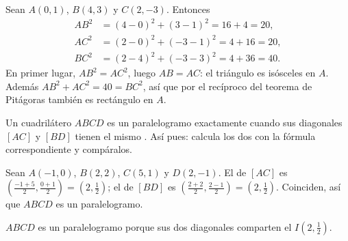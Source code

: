 \begin{example}\label{ex:g10:coordgeom:triangle}
Sean $A(0, 1)$, $B(4, 3)$ y $C(2, -3)$. Entonces
\begin{align*}
AB^2 &= (4-0)^2 + (3-1)^2 = 16 + 4 = 20, \\
AC^2 &= (2-0)^2 + (-3-1)^2 = 4 + 16 = 20, \\
BC^2 &= (2-4)^2 + (-3-3)^2 = 4 + 36 = 40 .
\end{align*}
En primer lugar, $AB^2 = AC^2$, luego $AB = AC$: el triángulo es isósceles
en $A$. Además $AB^2 + AC^2 = 40 = BC^2$, así que por el recíproco del
teorema de Pitágoras también es rectángulo en $A$.
\end{example}

\begin{method}\label{met:g10:coordgeom:parallelogram}
Un cuadrilátero $ABCD$ es un paralelogramo exactamente cuando sus
diagonales $[AC]$ y $[BD]$ tienen el mismo . Así pues: calcula
los dos  con la fórmula correspondiente y compáralos.
\end{method}

\begin{example}\label{ex:g10:coordgeom:parallelogram}
Sean $A(-1, 0)$, $B(2, 2)$, $C(5, 1)$ y $D(2, -1)$. El  de
$[AC]$ es $\left(\frac{-1+5}{2}, \frac{0+1}{2}\right) = (2, \frac12)$; el
de $[BD]$ es $\left(\frac{2+2}{2}, \frac{2-1}{2}\right) =
(2, \frac12)$. Coinciden, así que $ABCD$ es un paralelogramo.
\end{example}

\begin{omfigure}

{\small $ABCD$ es un paralelogramo porque sus dos diagonales comparten el
 $I(2, \frac12)$.}
\end{omfigure}

